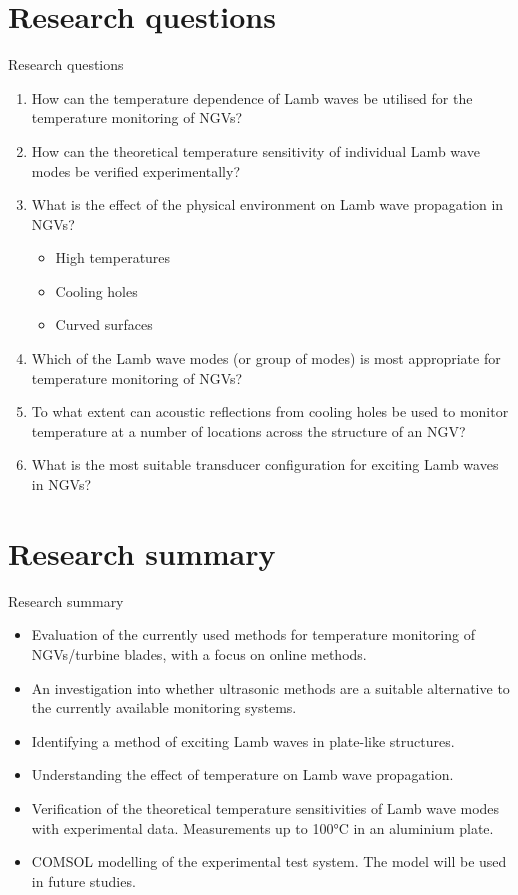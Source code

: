 \documentclass[aspectratio=169, 9pt]{beamer}
\begin{document}

\section{Research questions}
\begin{frame}{Research questions}

  \begin{enumerate}
      \item How can the temperature dependence of Lamb waves be utilised for the temperature monitoring of NGVs?\label{itm:1}
      \item How can the theoretical temperature sensitivity of individual Lamb wave modes be verified experimentally?\label{itm:2}
      \item What is the effect of the physical environment on Lamb wave propagation in NGVs?\label{itm:3}
  \begin{itemize}
      \item High temperatures
      \item Cooling holes
      \item Curved surfaces
  \end{itemize}
      \item Which of the Lamb wave modes (or group of modes) is most appropriate for temperature monitoring of NGVs?\label{itm:4}
      \item To what extent can acoustic reflections from cooling holes be used to monitor temperature at a number of locations across the structure of an NGV?\label{itm:5}
      \item What is the most suitable transducer configuration for exciting Lamb waves in NGVs?\label{itm:6}
  \end{enumerate}
\end{frame}


\section{Research summary}
\begin{frame}{Research summary}
  \begin{itemize}
    \item Evaluation of the currently used methods for temperature monitoring of NGVs/turbine blades, with a focus on online methods.
    \item An investigation into whether ultrasonic methods are a suitable alternative to the currently available monitoring systems.
    \item Identifying a method of exciting Lamb waves in plate-like structures.
    \item Understanding the effect of temperature on Lamb wave propagation.
    \item Verification of the theoretical temperature sensitivities of Lamb wave modes with experimental data. Measurements up to 100\si{\degreeCelsius} in an aluminium plate.
    \item COMSOL modelling of the experimental test system. The model will be used in future studies.
\end{itemize} 
\end{frame}
\end{document}
